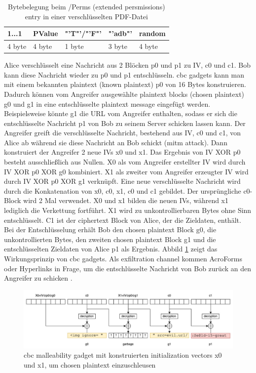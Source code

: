 \begin{table}[!htbp]
	\centering
	\begin{tabular}{|p{2cm}|p{2cm}|p{2cm}|p{2cm}|p{2cm}|}
	\hline
	\textbf{1...1}	& \textbf{PValue} 	& \textbf{"'T"'/"'F"'} 	& \textbf{"'adb"'} 	& \textbf{random} 	\\ 
	\hline
	4 byte 			& 4 byte 			& 1 byte  				& 3 byte 			& 4 byte 			\\ 
	\hline
	\end{tabular}
	\caption{Bytebelegung beim /Perms (extended persmissions) entry in einer verschlüsselten PDF-Datei \cite{ccc-break-pdf}}
	\label{table:perms}
\end{table}

Alice verschlüsselt eine Nachricht aus 2 Blöcken p0 und p1 zu IV, c0 und c1. Bob kann diese Nachricht wieder zu p0 und p1 entschlüsseln. \gls{cbc} gadgets kann man mit einem bekannten plaintext (known plaintext) p0 von 16 Bytes konstruieren. Dadurch können vom Angreifer ausgewählte plaintext blocks (chosen plaintext) g0 und g1 in eine entschlüsselte plaintext message eingefügt werden. Beispielsweise könnte g1 die URL vom Angreifer enthalten, sodass er sich die entschlüsselte Nachricht p1 von Bob zu seinem Server schicken lassen kann. Der Angreifer greift die verschlüsselte Nachricht, bestehend aus IV, c0 und c1, von Alice ab während sie diese Nachricht an Bob schickt (\gls{mitm} attack). Dann konstruiert der Angreifer 2 neue IVs x0 und x1. Das Ergebnis von IV XOR p0 besteht ausschließlich aus Nullen. X0 als vom Angreifer erstellter IV wird durch IV XOR p0 XOR g0 kombiniert. X1 als zweiter vom Angreifer erzeugter IV wird durch IV XOR p0 XOR g1 verknüpft. Eine neue verschlüsselte Nachricht wird durch die Konkatenation von x0, c0, x1, c0 und c1 gebildet. Der ursprüngliche c0-Block wird 2 Mal verwendet. X0 und x1 bilden die neuen IVs, während x1 lediglich die Verkettung fortführt. X1 wird zu unkontrollierbaren Bytes ohne Sinn entschlüsselt. C1 ist der ciphertext Block von Alice, der die Zieldaten, enthält. Bei der Entschlüsselung erhält Bob den chosen plaintext Block g0, die unkontrollierten Bytes, den zweiten chosen plaintext Block g1 und die entschlüsselten Zieldaten von Alice p1 als Ergebnis. Abbild \ref{fig:gadget} zeigt das Wirkungsprinzip von \gls{cbc} gadgets. Als exfiltration channel kommen AcroForms oder Hyperlinks in Frage, um die entschlüsselte Nachricht von Bob zurück an den Angreifer zu schicken \cite{gadget, ccc-break-pdf, crypto-web}.

\begin{figure}[!htbp]
	\centering
	\includegraphics[width=1\textwidth]{"images/gadget2-gadget.png"}
	\caption{\gls{cbc} malleability gadget mit konstruierten initialization vectors x0 und x1, um chosen plaintext einzuschleusen \cite{gadget}}
	\label{fig:gadget}
\end{figure}

